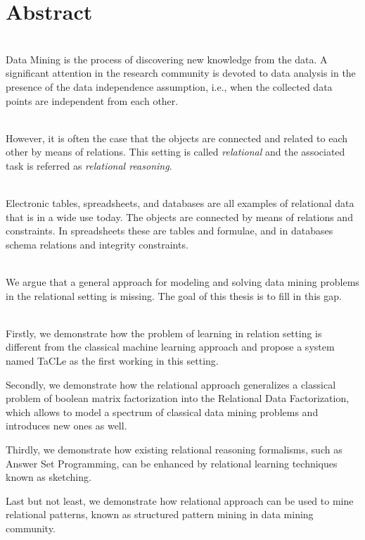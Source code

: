 \chapter{Abstract} \label{ch:abstract}
\\
Data Mining is the process of discovering new knowledge from the data.
A significant attention in the research community is devoted to data
analysis in the presence of the data independence assumption, i.e.,
when the collected data points are independent from each other.

\\
However, it is often the case that the objects are connected and
related to each other by means of relations. This setting is called
\textit{relational} and the associated task is referred as
\textit{relational reasoning}.

\\
Electronic tables, spreadsheets, and databases are all examples of
relational data that is in a wide use today. The objects are connected
by means of relations and constraints. In spreadsheets these are
tables and formulae, and in databases schema relations and integrity
constraints.

\\
We argue that a general approach for modeling and solving data mining  
problems in the relational setting is missing. The goal of this thesis
is to fill in this gap.


\\
Firstly, we demonstrate how the problem of learning in relation
setting is different from the classical machine learning approach and
propose a system named TaCLe as the first working in this setting.

Secondly, we demonstrate how the relational approach generalizes a
classical problem of boolean matrix factorization into the Relational
Data Factorization, which allows to model a spectrum of classical data
mining problems and introduces new ones as well.

Thirdly, we demonstrate how existing relational reasoning formalisms,
such as Answer Set Programming, can be enhanced by relational learning
techniques known as sketching.

Last but not least, we demonstrate how relational approach can be used
to mine relational patterns, known as structured pattern mining in
data mining community.


\cleardoublepage


